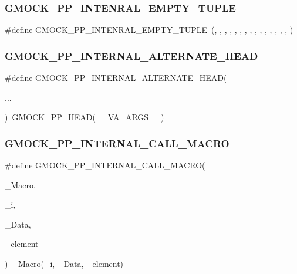 \subsubsection{\texorpdfstring{GMOCK\_PP\_INTENRAL\_EMPTY\_TUPLE}{GMOCK\_PP\_INTENRAL\_EMPTY\_TUPLE}}
{\footnotesize\ttfamily \#define G\+M\+O\+C\+K\+\_\+\+P\+P\+\_\+\+I\+N\+T\+E\+N\+R\+A\+L\+\_\+\+E\+M\+P\+T\+Y\+\_\+\+T\+U\+P\+LE~(, , , , , , , , , , , , , , , )}

\mbox{\label{_obj__test_2lib_2googletest-master_2googlemock_2include_2gmock_2internal_2gmock-pp_8h_a397716c397c91563dfbb9c3b974dc2dc}} 
\subsubsection{\texorpdfstring{GMOCK\_PP\_INTERNAL\_ALTERNATE\_HEAD}{GMOCK\_PP\_INTERNAL\_ALTERNATE\_HEAD}}
{\footnotesize\ttfamily \#define G\+M\+O\+C\+K\+\_\+\+P\+P\+\_\+\+I\+N\+T\+E\+R\+N\+A\+L\+\_\+\+A\+L\+T\+E\+R\+N\+A\+T\+E\+\_\+\+H\+E\+AD(\begin{DoxyParamCaption}\item[{}]{... }\end{DoxyParamCaption})~\mbox{\hyperlink{_obj__test_2lib_2googletest-master_2googlemock_2include_2gmock_2internal_2gmock-pp_8h_ad7910160dfc0fb20b239efcf1f3ddd85}{G\+M\+O\+C\+K\+\_\+\+P\+P\+\_\+\+H\+E\+AD}}(\+\_\+\+\_\+\+V\+A\+\_\+\+A\+R\+G\+S\+\_\+\+\_\+)}

\mbox{\label{_obj__test_2lib_2googletest-master_2googlemock_2include_2gmock_2internal_2gmock-pp_8h_a3fe0cf255d103cc945cd91e0e953846f}} 
\subsubsection{\texorpdfstring{GMOCK\_PP\_INTERNAL\_CALL\_MACRO}{GMOCK\_PP\_INTERNAL\_CALL\_MACRO}}
{\footnotesize\ttfamily \#define G\+M\+O\+C\+K\+\_\+\+P\+P\+\_\+\+I\+N\+T\+E\+R\+N\+A\+L\+\_\+\+C\+A\+L\+L\+\_\+\+M\+A\+C\+RO(\begin{DoxyParamCaption}\item[{}]{\+\_\+\+Macro,  }\item[{}]{\+\_\+i,  }\item[{}]{\+\_\+\+Data,  }\item[{}]{\+\_\+element }\end{DoxyParamCaption})~\+\_\+\+Macro(\+\_\+i, \+\_\+\+Data, \+\_\+element)}

